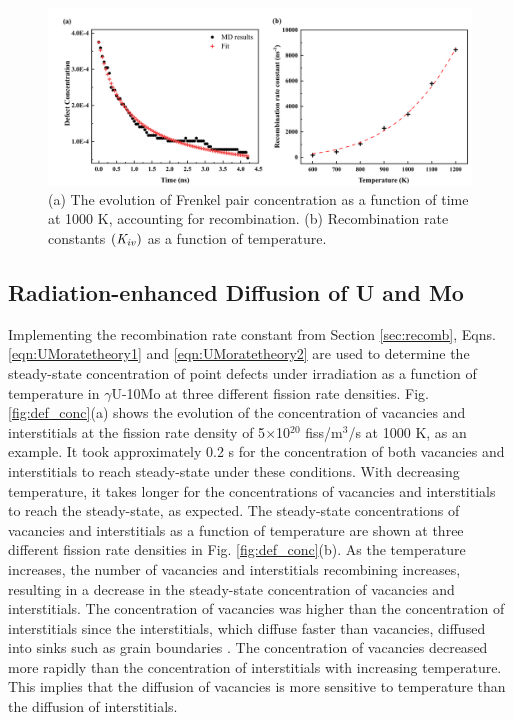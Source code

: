 \documentclass[preprint,12pt]{elsarticle}
\begin{document}
\begin{figure}[hbt!]
\centering
\includegraphics[width=1\textwidth]{Fig2.png}
\caption{(a) The evolution of Frenkel pair concentration as a function of time at 1000 K, accounting for recombination. (b) Recombination rate constants $(\it{K}_{iv})$ as a function of temperature.}
\label{fig:recomb}
\end{figure}

\subsection{Radiation-enhanced Diffusion of U and Mo}\label{sec:RED_UMo}
Implementing the recombination rate constant from Section \ref{sec:recomb}, Eqns. \ref{eqn:UMoratetheory1} and \ref{eqn:UMoratetheory2} are used to determine the steady-state concentration of point defects under irradiation as a function of temperature in $\gamma$U-10Mo at three different fission rate densities. Fig. \ref{fig:def_conc}(a) shows the evolution of the concentration of vacancies and interstitials at the fission rate density of 5$\times$10$^{20}$ fiss/m$^{3}$/s at 1000 K, as an example. It took approximately 0.2 s for the concentration of both vacancies and interstitials to reach steady-state under these conditions. With decreasing temperature, it takes longer for the concentrations of vacancies and interstitials to reach the steady-state, as expected. The steady-state concentrations of vacancies and interstitials as a function of temperature are shown at three different fission rate densities in Fig. \ref{fig:def_conc}(b). As the temperature increases, the number of vacancies and interstitials recombining increases, resulting in a decrease in the steady-state concentration of vacancies and interstitials. The concentration of vacancies was higher than the concentration of interstitials since the interstitials, which diffuse faster than vacancies, diffused into sinks such as grain boundaries \cite{park2021atomistic, smirnova2015atomistic}. The concentration of vacancies decreased more rapidly than the concentration of interstitials with increasing temperature. This implies that the diffusion of vacancies is more sensitive to temperature than the diffusion of interstitials.
\end{document}
